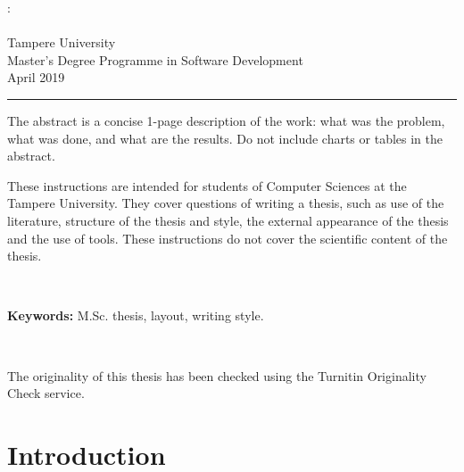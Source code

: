 \documentclass[12pt,a4paper,english
]{tunithesis}
\begin{document}
\begin{spacing}{1.0}
\noindent \@author: \@title\\
\@thesistype\\
Tampere University\\
Master’s Degree Programme in Software Development\\
April 2019
\end{spacing}
\noindent\rule{12cm}{0.4pt}

\vspace{0.5cm}


\noindent The abstract is a concise 1-page description of the work: what was the
problem, what was done, and what are the results. Do not include
charts or tables in the abstract.

These instructions are intended for students of Computer Sciences at the Tampere University. They cover questions of writing a thesis, such as use of the literature, structure of the thesis and style, the external appearance of the thesis and the use of tools.  These instructions do not cover the scientific content of the thesis.

~

\noindent\textbf{Keywords:} M.Sc. thesis, layout, writing style.

~

\noindent The originality of this thesis has been checked using the Turnitin Originality Check service.




\setcounter{tocdepth}{3}              %
\tableofcontents                      %


\if@twoside
\cleardoublepage
\fi


\renewcommand{\chaptername}{} %


\chapter{Introduction}
\label{ch:intro} 

\setcounter{page}{1} %
                     
\end{document}
